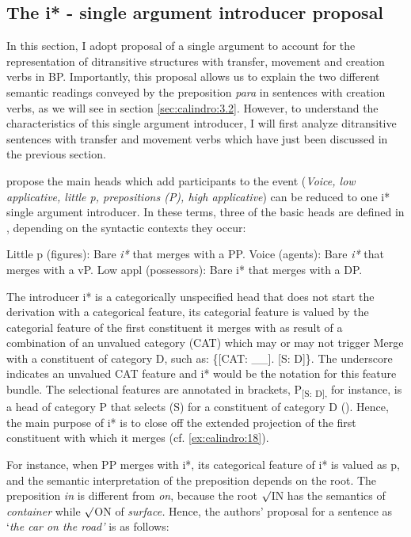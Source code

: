 \documentclass[output=paper,colorlinks,citecolor=brown]{./langscibook}
\begin{document}
\subsection{The i* - single argument introducer proposal}\label{sec:calindro:3.1}

In this section, I adopt  proposal of a single argument to account for the representation of ditransitive structures with transfer, movement and creation verbs in BP. Importantly, this proposal allows us to explain the two different semantic readings conveyed by the preposition \textit{para} in sentences with creation verbs, as we will see in section \ref{sec:calindro:3.2}. However, to understand the characteristics of this single argument introducer, I will first analyze ditransitive sentences with transfer and movement verbs which have just been discussed in the previous section.

\citet{WoodMarantz2017} propose the main heads which add participants to the event (\textit{Voice, low applicative, little p, prepositions (P), high applicative}) can be reduced to one i* single argument introducer. In these terms, three of the basic heads are defined in , depending on the syntactic contexts they occur:

\ea%
    \label{ex:calindro:17}
    \ea\label{ex:calindro:17a} Little p (figures): Bare \textit{i*} that merges with a PP.
    \ex\label{ex:calindro:17b} Voice (agents): Bare \textit{i*} that merges with a vP.
    \ex\label{ex:calindro:17c} Low appl (possessors): Bare i* that merges with a DP. \hfill \citep[258]{WoodMarantz2017}
    \z
\z

The introducer i* is a categorically unspecified head that does not start the derivation with a categorical feature, its categorial feature is valued by the categorial feature of the first constituent it merges with as result of a combination of an unvalued category (CAT) which may or may not trigger Merge with a constituent of category D, such as: \{[CAT: \_\_]. [S: D]\}. The underscore indicates an unvalued CAT feature and i* would be the notation for this feature bundle. The selectional features are annotated in brackets, P\textsubscript{[S: D],} for instance,\textsubscript{}  is a head of category P that selects (S) for a constituent of category D (\citealt[257]{WoodMarantz2017}). Hence, the main purpose of i* is to close off the extended projection of the first constituent with which it merges (cf. \ref{ex:calindro:18}). 

For instance, when PP merges with i*, its categorical feature of i* is valued as p, and the semantic interpretation of the preposition depends on the root. The preposition \textit{in} is different from \textit{on}, because the root ${\surd}$IN has the semantics of \textit{container} while ${\surd}$ON of \textit{surface.} Hence, the authors’ proposal for a sentence as ‘\textit{the car on the road’} is as follows:
\end{document}
